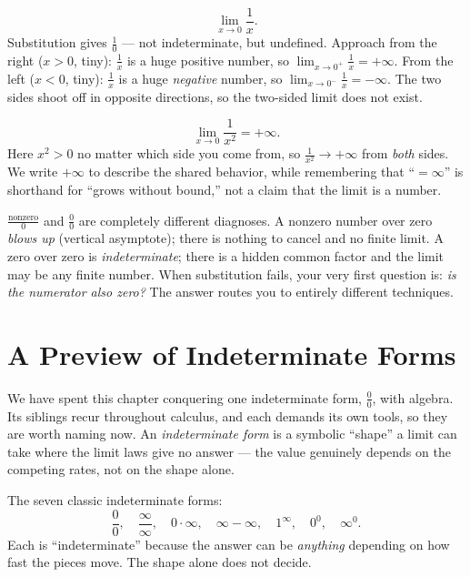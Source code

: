 \begin{example}
\label{ch07:ex-blowup}
\[
  \lim_{x\to 0}\frac{1}{x}.
\]
Substitution gives $\frac{1}{0}$ --- not indeterminate, but undefined.
Approach from the right ($x>0$, tiny): $\frac1x$ is a huge positive number, so
$\displaystyle\lim_{x\to 0^{+}}\frac1x = +\infty$. From the left ($x<0$, tiny):
$\frac1x$ is a huge \emph{negative} number, so
$\displaystyle\lim_{x\to 0^{-}}\frac1x = -\infty$. The two sides shoot off in
opposite directions, so the two-sided limit does not exist.
\end{example}

\begin{example}
\label{ch07:ex-blowup2}
\[
  \lim_{x\to 0}\frac{1}{x^{2}} = +\infty.
\]
Here $x^2 > 0$ no matter which side you come from, so $\frac{1}{x^2}\to+\infty$
from \emph{both} sides. We write $+\infty$ to describe the shared behavior,
while remembering that ``$=\infty$'' is shorthand for ``grows without bound,''
not a claim that the limit is a number.
\end{example}

\begin{trapbox}
$\frac{\text{nonzero}}{0}$ and $\frac{0}{0}$ are completely different
diagnoses. A nonzero number over zero \emph{blows up} (vertical asymptote);
there is nothing to cancel and no finite limit. A zero over zero is
\emph{indeterminate}; there is a hidden common factor and the limit may be any
finite number. When substitution fails, your very first question is: \emph{is
the numerator also zero?} The answer routes you to entirely different
techniques.
\end{trapbox}

\section{A Preview of Indeterminate Forms}
\label{ch07:indeterminate}

We have spent this chapter conquering one indeterminate form, $\frac00$, with
algebra. Its siblings recur throughout calculus, and each demands its own
tools, so they are worth naming now. An \emph{indeterminate form} is a
symbolic ``shape'' a limit can take where the limit laws give no answer ---
the value genuinely depends on the competing rates, not on the shape alone.

\begin{focusbox}
The seven classic indeterminate forms:
\[
  \frac{0}{0},\quad \frac{\infty}{\infty},\quad 0\cdot\infty,\quad
  \infty-\infty,\quad 1^{\infty},\quad 0^{0},\quad \infty^{0}.
\]
Each is ``indeterminate'' because the answer can be \emph{anything} depending
on how fast the pieces move. The shape alone does not decide.
\end{focusbox}

